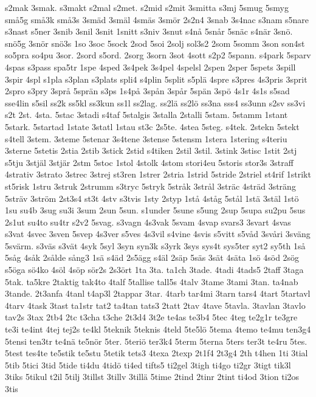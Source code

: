 {s2mak
3smak.
s3makt
s2mal
s2met.
s2mid
s2mit
3smitta
s3mj
5smug
5smyg
små5g
små3k
små3s
3smäd
3smäl
4smäs
3smör
2s2n4
3snab
3s4nac
s3nam
s5nare
s3nast
s5ner
3snib
3snil
3snit
1snitt
s3niv
3snut
s4nå
5snår
5snäc
s4när
3snö.
snö5g
3snör
snö3s
1so
3soc
5sock
2sod
5soi
2solj
sol3s2
2som
5somm
3son
son4st
so5pra
so4pu
3sor.
2sord
s5ord.
2sorg
3sorn
3sot
4sott
s2p2
5spann.
s4park
5sparv
4spas
s3pass
spa5tr
1spe
4sped
3s4pek
3s4pel
4spelsl
2spen
2sper
5spets
3spill
3spir
4spl
s1pla
s3plan
s3plats
spli4
s4plin
5split
s5plä
4spre
s3pres
4s3pris
3sprit
2spro
s3pry
3språ
5sprän
s3ps
1s4på
3spån
3spår
5spän
3spö
4s1r
4s1s
s5sad
sse4lin
s5sil
ss2k
ss5kl
ss3kun
ss1l
ss2lag.
ss2lä
ss2lö
ss3na
sss4
ss3unn
s2sv
ss3vi
s2t
2st.
4sta.
5stac
3stadi
s4taf
5stalgis
3stalla
2stalli
5stam.
5stamm
1stant
5stark.
5startad
1state
3statl
1stau
st3c
2s5te.
4stea
5steg.
s4tek.
2stekn
5stekt
s4tell
3stem.
3steme
5stenar
3s4tene
3stense
5stensm
1stera
1stering
s4teriu
3sterne
5stetis
2stia
2stib
3stick
2stid
s4tiken
2stil
3stil.
3stink
3stisc
1stit
2stj
s5tju
3stjäl
3stjär
2stm
5stoc
1stol
4stolk
4stom
stori4eu
5storis
stor3s
3straff
4strativ
3strato
3strec
3strej
st3ren
1strer
2stria
1strid
5stride
2striel
st4rif
1strikt
st5risk
1stru
3struk
2strumm
s3tryc
5stryk
5stråk
3strål
3sträc
4sträd
3sträng
5sträv
3ström
2st3s4
st3t
4stv
s3tvis
1sty
2styp
1stå
4ståg
5stål
1stä
3stäl
1stö
1su
su4b
3sug
su3i
3sum
2sun
5sun.
s1under
5sune
s5ung
2sup
5supa
su2pu
5sus
2s1ut
su4to
su4tr
s2v2
5svag.
s3vagn
4s3vak
5svam
4svap
svars3
3svart
4svas
s3vat
4svec
3sven
5svep
4s3ver
s5ves
4s3vil
s4vine
4svis
s5vitt
s5våd
3svåri
3sväng
5svärm.
s3väs
s3vät
4syk
5syl
3syn
syn3k
s3yrk
3sys
sys4t
sys5ter
syt2
sy5th
1så
5såg
4såk
2sålde
sång3
1sä
s4äd
2s5ägg
s4äl
2säp
5säs
3sät
4säta
1sö
4söd
2sög
s5öga
sö4ko
4söl
4söp
sör2s
2s3ört
1ta
3ta.
ta1ch
3tade.
4tadi
4tads5
2taff
3taga
5tak.
ta5kre
2taktig
tak4to
4talf
5tallise
tall5s
4talv
3tame
3tami
3tan.
ta4nab
3tande.
2t3anfa
4tanl
t4ap3l
2tappar
3tar.
4tarb
tar4mi
3tarn
tars4
4tart
5tartavl
4tarv
4task
3tast
ta1str
tat2
ta4tan
tats3
2tatt
2tav
4tave
5tavla.
3tavlan
3tavlo
tav2s
3tax
2tb4
2tc
t3cha
t3che
2t3d4
3t2e
te4as
te3b4
5tec
4teg
te2g1r
te3gre
te3i
te4int
4tej
tej2s
te4kl
5teknik
5teknis
4teld
5te5lö
5tema
4temo
te4mu
ten3g4
5tensi
ten3tr
te4nä
te5nör
5ter.
5teriö
ter3k4
5term
5terna
5ters
ter3t
te4ru
5tes.
5test
tes4te
te5stik
te5stu
5tetik
tets3
4texa
2texp
2t1f4
2t3g4
2th
t4hen
1ti
3tial
5tib
5tici
3tid
5tide
ti4du
4tidö
ti4ed
tifts5
ti2gel
3tigh
ti4go
ti2gr
3tigt
tik3l
3tiks
5tikul
t2il
5tilj
3tillst
3tillv
3tillä
5time
2tind
2tinr
2tint
ti4od
3tion
ti2os
3tis
}
